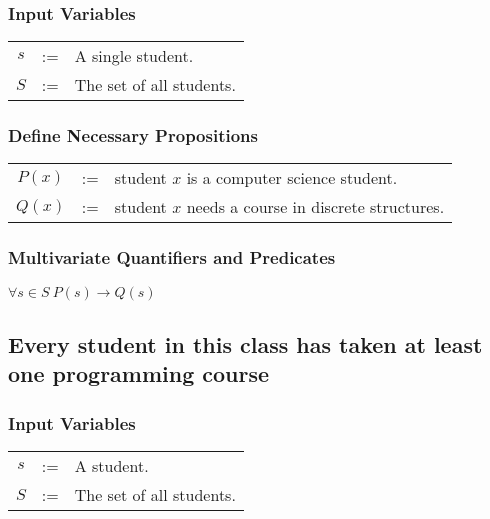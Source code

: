 \documentclass{article}
\begin{document}
\subsubsection{Input Variables}
\begin{center}
  \begin{tabular}{ccl}
    $s$ & := & A single student. \\ 
    $S$ & := & The set of all students. \\ 
  \end{tabular}
\end{center}

\subsubsection{Define Necessary Propositions}
\begin{center}
  \begin{tabular}{ccl}
    $P(x)$ & := & student $x$ is a computer science student. \\
    $Q(x)$ & := & student $x$ needs a course in discrete structures. \\ 
  \end{tabular}
\end{center}

\subsubsection{Multivariate Quantifiers and Predicates}
\begin{center}
  $ \forall s \in S~P(s) \rightarrow Q(s)$
\end{center}


\subsection{Every student in this class has taken at least one programming course}

\subsubsection{Input Variables}
\begin{center}
  \begin{tabular}{ccl}
    $s$ & := & A student. \\
    $S$ & := & The set of all students. \\
  \end{tabular}
\end{center}
\end{document}
